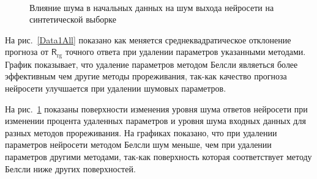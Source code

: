 \begin{figure}[h!t]\center
{}
\\
\caption{Влияние шума в начальных данных на шум выхода нейросети на синтетической выборке}
\label{Data1Noise}
\end{figure}

На рис.~\ref{Data1All} показано как меняется среднеквадратическое отклонение прогноза от $\mathsf{R}_{\text{rg}}$ точного ответа при удалении параметров указанными методами. График показывает, что удаление параметров методом Белсли являеться более эффективным чем другие методы прореживания, так-как качество прогноза нейросети улучшается при удалении шумовых параметров.

На рис.~\ref{Data1Noise} показаны поверхности изменения уровня шума ответов нейросети при изменении процента удаленных параметров и уровня шума входных данных для разных методов прореживания. На графиках показано, что при удалении параметров нейросети методом Белсли шум меньше, чем при удалении параметров другими методами, так-как поверхность которая соответствует методу Белсли ниже других поверхностей.
